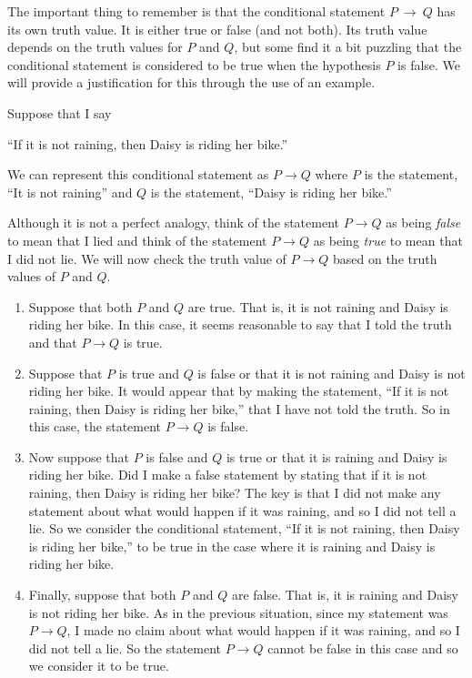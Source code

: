 The important thing to remember is that the conditional statement $P~\to~Q$ has its own truth value.  It is either true or false (and not both).  Its truth value depends on the truth values for $P$ and $Q$, but some find it a bit puzzling that the conditional statement is considered to be true when the hypothesis $P$ is false.  We will provide a justification for this through the use of an example.

\begin{example}
Suppose that I say
\begin{center}
``If it is not raining, then Daisy is riding her bike.''
\end{center}
We can represent this conditional statement as $P \to Q$ where $P$ is the statement, ``It is not raining'' and $Q$ is the statement, ``Daisy is riding her bike.''

Although it is not a perfect analogy, think of the statement $P \to Q$ as being \emph{false} to mean that I lied and think of the statement $P \to Q$ as being \emph{true} to mean that I did not lie.  We will now check the truth value of $P \to Q$ based on the truth values of $P$ and $Q$.

\begin{enumerate}
  \item Suppose that both $P$ and $Q$ are true.  That is, it is not raining and Daisy is riding her bike.  In this case, it seems reasonable to say that I told the truth and that $P \to Q$ is true.
  \item Suppose that $P$ is true and $Q$ is false or that it is not raining and Daisy is not riding her bike.  It would appear that by making the statement, ``If it is not raining, then Daisy is riding her bike,'' that I have not told the truth.  So in this case, the statement $P \to Q$ is false.
  \item Now suppose that $P$ is false and $Q$ is true or that it is raining and Daisy is riding her bike.  Did I make a false statement by stating that if it is not raining, then Daisy is riding her bike?  The key is that I did not make any statement about what would happen if it was raining, and so I did not tell a lie.  So we consider the conditional statement, ``If it is not raining, then Daisy is riding her bike,'' to be true in the case where it is raining and Daisy is riding her bike.
  \item Finally, suppose that both $P$ and $Q$ are false.  That is, it is raining and Daisy is not riding her bike.  As in the previous situation, since my statement was $P \to Q$, I made no claim about what would happen if it was raining, and so I did not tell a lie.  So the statement $P \to Q$ cannot be false in this case and so we consider it to be true.
\end{enumerate}

\end{example}

